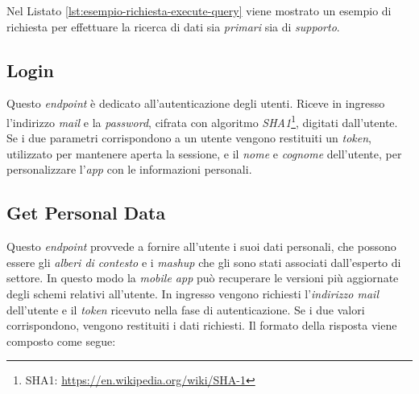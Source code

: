 Nel Listato \ref{lst:esempio-richiesta-execute-query} viene mostrato un esempio di richiesta per effettuare la ricerca di dati sia \emph{primari} sia di \emph{supporto}.

\subsection{Login\label{sec:login-endpoint}}

Questo \emph{endpoint} è dedicato all'autenticazione degli utenti. Riceve in ingresso l'indirizzo \emph{mail} e la \emph{password}, cifrata con algoritmo \emph{SHA1}\footnote{SHA1: \url{https://en.wikipedia.org/wiki/SHA-1}}, digitati dall'utente. Se i due parametri corrispondono a un utente vengono restituiti un \emph{token}, utilizzato per mantenere aperta la sessione, e il \emph{nome} e \emph{cognome} dell'utente, per personalizzare l'\emph{app} con le informazioni personali.

\subsection{Get Personal Data\label{sec:get-personal-data-endpoint}}

Questo \emph{endpoint} provvede a fornire all'utente i suoi dati personali, che possono essere gli \emph{alberi di contesto} e i \emph{mashup} che gli sono stati associati dall'esperto di settore. In questo modo la \emph{mobile app} può recuperare le versioni più aggiornate degli schemi relativi all'utente. In ingresso vengono richiesti l'\emph{indirizzo mail} dell'utente e il \emph{token} ricevuto nella fase di autenticazione. Se i due valori corrispondono, vengono restituiti i dati richiesti. Il formato della risposta viene composto come segue:


